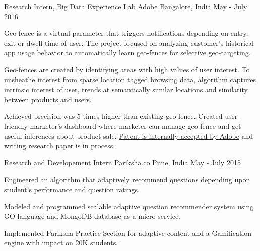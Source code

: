 

\begin{cventries}

  \cventry
    {Research Intern, Big Data Experience Lab} %
    {Adobe} %
    {Bangalore, India} %
    {May - July 2016} %
    {
      \begin{cvitems} %
        \item {Geo-fence is a virtual parameter that triggers notifications depending on entry, exit or dwell time of user. The project focused on analyzing customer’s historical app usage behavior to automatically learn geo-fences for selective geo-targeting.}
        \item {Geo-fences are created by identifying areas with high values of user interest. To unsheathe interest from sparse location tagged browsing data, algorithm captures intrinsic interest of user, trends at semantically similar locations and similarity between products and users.}
        \item {Achieved precision was 5 times higher than existing geo-fence. Created user-friendly marketer’s dashboard where marketer can manage geo-fence and get useful inferences about product sale. \underline{Patent is internally accepted by Adobe} and writing research paper is in process.}
      \end{cvitems}
    }

  \cventry
    {Research and Developement Intern} %
    {Pariksha.co} %
    {Pune, India} %
    {May - July 2015} %
    {
      \begin{cvitems} 
      	\item {Engineered an algorithm that adaptively recommend questions depending upon student’s performance and question ratings.}
      	\item {Modeled and programmed scalable adaptive question recommender system using GO language and MongoDB database as a micro service.}
      	\item {Implemented Pariksha Practice Section for adaptive content and a Gamification engine with impact on 20K students.}
      \end{cvitems}
    }
\end{cventries}
